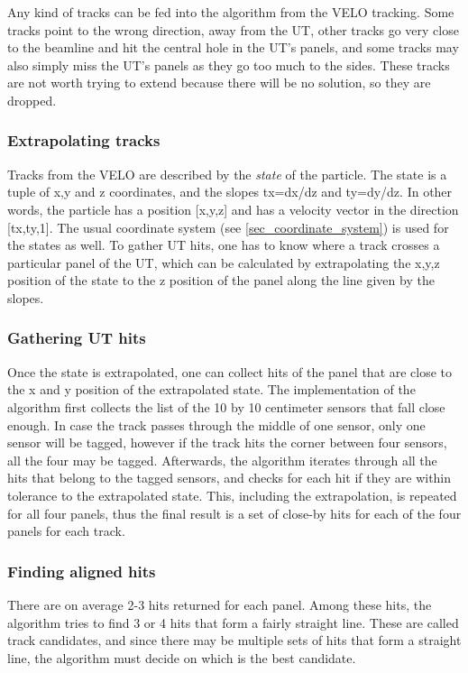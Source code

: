 \documentclass[12pt]{article}
\begin{document}
Any kind of tracks can be fed into the algorithm from the VELO tracking. Some tracks point to the wrong direction, away from the UT, other tracks go very close to the beamline and hit the central hole in the UT's panels, and some tracks may also simply miss the UT's panels as they go too much to the sides. These tracks are not worth trying to extend because there will be no solution, so they are dropped.


\subsubsection{Extrapolating tracks}

Tracks from the VELO are described by the \textit{state} of the particle. The state is a tuple of x,y and z coordinates, and the slopes tx=dx/dz and ty=dy/dz. In other words, the particle has a position [x,y,z] and has a velocity vector in the direction [tx,ty,1]. The usual coordinate system (see \ref{sec_coordinate_system}) is used for the states as well. To gather UT hits, one has to know where a track crosses a particular panel of the UT, which can be calculated by extrapolating the x,y,z position of the state to the z position of the panel along the line given by the slopes.


\subsubsection{Gathering UT hits}

Once the state is extrapolated, one can collect hits of the panel that are close to the x and y position of the extrapolated state. The implementation of the algorithm first collects the list of the 10 by 10 centimeter sensors that fall close enough. In case the track passes through the middle of one sensor, only one sensor will be tagged, however if the track hits the corner between four sensors, all the four may be tagged. Afterwards, the algorithm iterates through all the hits that belong to the tagged sensors, and checks for each hit if they are within tolerance to the extrapolated state. This, including the extrapolation, is repeated for all four panels, thus the final result is a set of close-by hits for each of the four panels for each track.


\subsubsection{Finding aligned hits}

There are on average 2-3 hits returned for each panel. Among these hits, the algorithm tries to find 3 or 4 hits that form a fairly straight line. These are called track candidates, and since there may be multiple sets of hits that form a straight line, the algorithm must decide on which is the best candidate.
\end{document}
